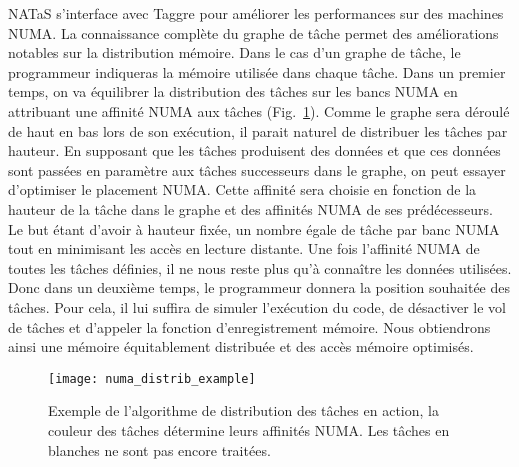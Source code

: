 NATaS s'interface avec Taggre pour améliorer les performances sur des machines NUMA.
%
La connaissance complète du graphe de tâche permet des améliorations notables sur la distribution mémoire.
%
Dans le cas d'un graphe de tâche, le programmeur indiqueras la mémoire utilisée dans chaque tâche.
%
Dans un premier temps, on va équilibrer la distribution des tâches sur les bancs NUMA en attribuant une affinité NUMA aux tâches (Fig.~\ref{fig:numa_distrib_example}).
%
Comme le graphe sera déroulé de haut en bas lors de son exécution, il parait naturel de distribuer les tâches par hauteur.
%
En supposant que les tâches produisent des données et que ces données sont passées en paramètre aux tâches successeurs dans le graphe, on peut essayer d'optimiser le placement NUMA.
%
Cette affinité sera choisie en fonction de la hauteur de la tâche dans le graphe et des affinités NUMA de ses prédécesseurs.
%
Le but étant d'avoir à hauteur fixée, un nombre égale de tâche par banc NUMA tout en minimisant les accès en lecture distante.
%
Une fois l'affinité NUMA de toutes les tâches définies, il ne nous reste plus qu'à connaître les données utilisées.
%
Donc dans un deuxième temps, le programmeur donnera la position souhaitée des tâches.
%
Pour cela, il lui suffira de simuler l'exécution du code, de désactiver le vol de tâches et d'appeler la fonction d'enregistrement mémoire.
%
Nous obtiendrons ainsi une mémoire équitablement distribuée et des accès mémoire optimisés.


\begin{figure}[!h]
  \centering
  \texttt{[image: numa\_distrib\_example]}
  \caption{Exemple de l'algorithme de distribution des tâches en action, la couleur des tâches détermine leurs affinités NUMA. Les tâches en blanches ne sont pas encore traitées.}
  \label{fig:numa_distrib_example}
\end{figure}
